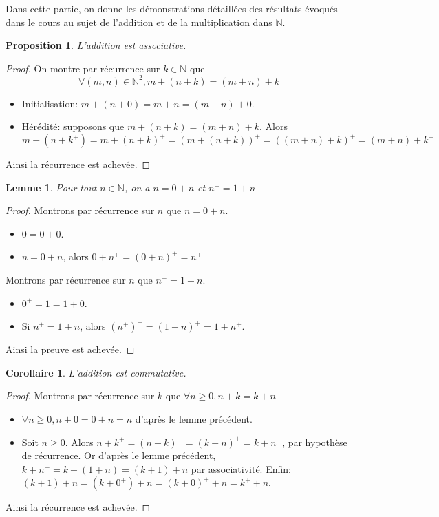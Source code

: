 \documentclass[french]{book}
\theoremstyle{plain}
\newtheorem{lem}{Lemme}[chapter]
\newtheorem{prop}{Proposition}[chapter]
\newtheorem{cor}{Corollaire}[chapter]
\theoremstyle{definition}
\theoremstyle{remark}
\begin{document}
Dans cette partie, on donne les démonstrations détaillées des résultats évoqués dans le cours au sujet de l'addition et de la multiplication dans $\mathbb{N}$.
\begin{prop}
	L'addition est associative.
\end{prop}
\begin{proof}
	On montre par récurrence sur $k \in \mathbb{N}$ que $$\forall (m, n) \in \mathbb{N}^2, m + (n + k) = (m + n) + k$$
\begin{itemize}
	\item Initialisation: $m + (n + 0) = m + n = (m + n) + 0$.
	\item Hérédité: supposons que $m + (n + k) = (m + n) + k$. Alors $$m + (n + k^+) = m + (n + k)^+ = (m + (n + k))^+ = ((m + n) + k)^+ = (m + n) + k^+$$
\end{itemize}
Ainsi la récurrence est achevée.
\end{proof}
\begin{lem}
	Pour tout $n \in \mathbb{N}$, on a $n = 0 + n$ et $n^+ = 1 + n$
\end{lem}
\begin{proof}
	Montrons par récurrence sur $n$ que $n = 0 + n$.
\begin{itemize}
	\item $0 = 0 + 0$.
	\item $n = 0 + n$, alors $0 + n^{+} = (0 + n)^{+} = n^{+}$
\end{itemize}
Montrons par récurrence sur $n$ que $n^{+} = 1 + n$.
\begin{itemize}
	\item $0^{+} = 1 = 1 + 0$.
	\item Si $n^{+} = 1 + n$, alors $(n^{+})^{+} = (1 + n)^{+} = 1 + n^{+}$.
\end{itemize}
Ainsi la preuve est achevée.
\end{proof}
\begin{cor}
	L'addition est commutative.
\end{cor}
\begin{proof}
	Montrons par récurrence sur $k$ que $\forall n \geqslant 0, n + k = k + n$
\begin{itemize}
	\item $\forall n \geqslant 0, n + 0 = 0 + n = n$ d'après le lemme précédent.
	\item Soit $n \geqslant 0$. Alors $n + k^{+} = (n + k)^{+} = (k + n)^{+} = k + n^{+}$,
	par hypothèse de récurrence.
	Or d'après le lemme précédent, $k + n^{+} = k + (1 + n) = (k + 1) + n$ par associativité.
	Enfin: $(k + 1) + n = (k + 0^{+}) + n = (k + 0)^{+} + n = k^{+} + n$.
\end{itemize}
Ainsi la récurrence est achevée.
\end{proof}
\end{document}
